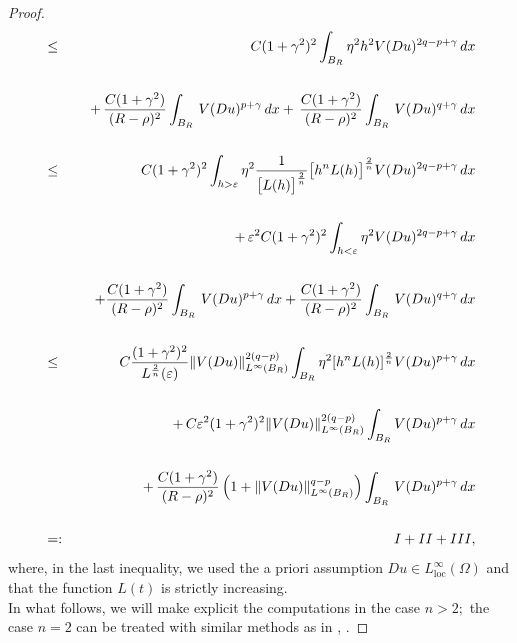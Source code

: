\documentclass[12pt]{amsart}
\theoremstyle{definition}
\numberwithin{equation}{section}
\numberwithin{equation}{section}
\begin{document}
{\begin{proof}
\begin{eqnarray}
&\le& C (1+\gamma^2)^2  \int_{B_{{R}}}  \eta^2h^2 V(Du)^{2q-p + \gamma}  \, dx\cr\cr
&&\quad+\,\frac{C(1+\gamma^2)}{(R - \rho)^{2}} \int_{B_{{R}}}  \,  V(Du)^{p + \gamma}  \, dx+\,\frac{C(1+\gamma^2)}{(R - \rho)^{2}} \int_{B_{{R}}}  \,  V(Du)^{q + \gamma}  \, dx \cr\cr
&\le &  C (1+\gamma^2)^2  \int_{{h >\varepsilon}}\eta^2
\frac{1}{{\big[L(h)\big]^{\frac{2}{n}}}} \big[h^n L(h)\big]^{\frac{2}{n}} V(Du)^{2q-p + \gamma}  \, dx \cr \cr 
&& \quad+ \,\varepsilon^2 C (1+\gamma^2)^2  \int_{{h < \varepsilon}}\eta^2 V(Du)^{2q-p + \gamma}   \, dx\cr\cr
&&\quad+\frac{C(1+\gamma^2)}{(R - \rho)^{2}} \int_{B_{{R}}}  \,  V(Du)^{p + \gamma} \, dx+\frac{C(1+\gamma^2)}{(R - \rho)^{2}} \int_{B_{{R}}}  \,  V(Du)^{q + \gamma}  \, dx \cr \cr 
&\le & C\frac{(1+\gamma^2)^2}{{L^{\frac{2}{n}}(\varepsilon)}} \|V(Du)\|_{L^\infty(B_{R})}^{2(q-p)} \int_{B_{{R}}}\eta^2 {[h^n L(h)]^{\frac{2}{n}}} V(Du)^{p + \gamma} \,dx\cr\cr
&& \quad+ \,C\varepsilon^2(1+\gamma^2)^2 \|V(Du)\|_{L^\infty(B_{{R}})}^{2(q-p)} \int_{B_{{R}}} V(Du)^{p + \gamma} \, dx\cr\cr
&&\quad+\,\frac{C(1+\gamma^2)}{({R - \rho})^{2}} \left(1 + \|V(Du)\|_{L^\infty(B_{{R}})}^{q-p} \right) \int_{B_{{R}}}  \,  V(Du)^{p + \gamma}  \, dx\cr \cr 
&=:& I + II + III,
\end{eqnarray}
where, in the last inequality, we used the a priori assumption $Du\in L^\infty_{\mathrm{loc}}(\Omega)$ and that the function $L(t)$ is strictly increasing.
\\
In what follows, we will make explicit the computations in the case $n > 2;$ the case $n = 2$ can be treated with similar methods as in \cite{CGHPdN20}, \cite{EPdN23}.


\end{proof}}
\end{document}
